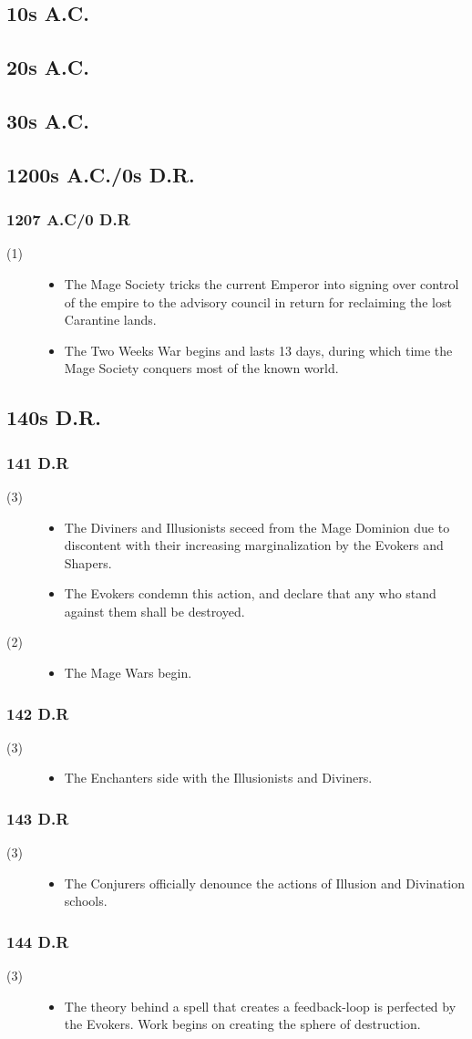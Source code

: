 \documentclass[a4paper, 11pt]{article}
\def\level#1{\item[(#1)\hspace{9.5pt}]}
\newenvironment{knowlevels}{\begin{description}}{\end{description}} %
\def\decadeblk#1{\subsection{#1}}
\def\yearblk#1{\subsubsection{#1}}
\begin{document}
\decadeblk{10s A.C.}
\decadeblk{20s A.C.}
\decadeblk{30s A.C.}

\decadeblk{1200s A.C./0s D.R.}
\yearblk{1207 A.C/0 D.R}
\begin{knowlevels}
\level{1} {
\begin{itemize}
\item The Mage Society tricks the current Emperor into signing over control of the empire to the advisory council in return for reclaiming the lost Carantine lands.
\item The Two Weeks War begins and lasts 13 days, during which time the Mage Society conquers most of the known world. 
\end{itemize}
}
\end{knowlevels}

\decadeblk{140s D.R.}
\yearblk{141 D.R}
\begin{knowlevels}
\level{3} {
\begin{itemize}
\item The Diviners and Illusionists seceed from the Mage Dominion due to discontent with their increasing marginalization by the Evokers and Shapers.
\item The Evokers condemn this action, and declare that any who stand against them shall be destroyed.
\end{itemize}
}
\level{2} {
\begin{itemize}
\item The Mage Wars begin.
\end{itemize}
}
\end{knowlevels}

\yearblk{142 D.R}
\begin{knowlevels}
\level{3} {
\begin{itemize}
\item The Enchanters side with the Illusionists and Diviners. 
\end{itemize}
}
\end{knowlevels}

\yearblk{143 D.R}
\begin{knowlevels}
\level{3} {
\begin{itemize}
\item The Conjurers officially denounce the actions of Illusion and Divination schools.
\end{itemize}
}
\end{knowlevels}

\yearblk{144 D.R}
\begin{knowlevels}
\level{3} {
\begin{itemize}
\item The theory behind a spell that creates a feedback-loop is perfected by the Evokers. Work begins on creating the sphere of destruction.
\end{itemize}
}
\end{knowlevels}
\end{document}

